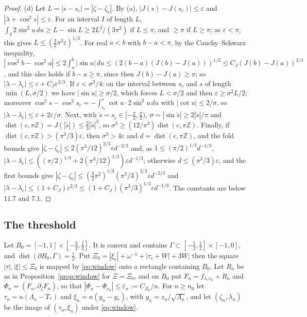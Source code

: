 \documentclass[11pt]{amsart}
\theoremstyle{definition}
\theoremstyle{remark}
\numberwithin{equation}{section}
\newcommand{\Z}{\mathbb{Z}}
\newcommand{\eps}{\varepsilon}
\DeclareMathOperator{\dist}{dist}
\begin{document}
\begin{proof}
(d) Let $L=|s-s_c|=|\zeta-\zeta_c|$. By (a), $|J(s)-J(s_c)|\le\eps$ and $|\lambda+\cos^2s|\le\eps$. For an interval
$I$ of length $L$, $\int_I2\sin^2u\,du\ge L-\sin L\ge2L^3/(3\pi^2)$ if $L\le\pi$, and $\ge\pi$ if $L\ge\pi$; as $\eps<\pi$,
this gives $L\le(\frac32\pi^2\eps)^{1/3}$. For real $a<b$ with $b-a<\pi$, by the Cauchy--Schwarz inequality,
$|\cos^2b-\cos^2a|\le2\int_a^b|\sin u|\,du\le(2(b-a)(J(b)-J(a)))^{1/2}\le C_J(J(b)-J(a))^{2/3}$, and this also holds
if $b-a\ge\pi$, since then $J(b)-J(a)\ge\pi$; so $|\lambda-\lambda_c|\le\eps+C_J\eps^{2/3}$. If $\eps<\sigma^3/4$: on
the interval between $s_c$ and $s$ of length $\min(L,\sigma/2)$ we have $|\sin u|\ge\sigma/2$, which forces
$L<\sigma/2$ and then $\eps\ge\sigma^2L/2$; moreover $\cos^2s-\cos^2s_c=-\int_{s_c}^s\cot u\cdot2\sin^2u\,du$ with
$|\cot u|\le2/\sigma$, so $|\lambda-\lambda_c|\le\eps+2\eps/\sigma$. Next, with $\tilde s=s_{\tilde c}\in[-\frac\pi2,\frac\pi2)$,
$\sigma=|\sin\tilde s|\ge2|\tilde s|/\pi$ and $\dist(c,\pi\Z)=J(|\tilde s|)\le\frac23|\tilde s|^3$, so
$\sigma^3\ge(12/\pi^3)\dist(c,\pi\Z)$. Finally, if $\dist(c,\pi\Z)>(\pi^3/3)\eps$, then $\sigma^3>4\eps$ and $d=\dist(c,\pi\Z)$,
and the fold bounds give $|\zeta-\zeta_c|\le2(\pi^3/12)^{2/3}\eps d^{-2/3}$ and, as $1\le(\pi/2)^{1/3}d^{-1/3}$,
$|\lambda-\lambda_c|\le((\pi/2)^{1/3}+2(\pi^3/12)^{1/3})\eps d^{-1/3}$; otherwise $d\le(\pi^3/3)\eps$, and the first
bounds give $|\zeta-\zeta_c|\le(\frac32\pi^2)^{1/3}(\pi^3/3)^{2/3}\eps d^{-2/3}$ and
$|\lambda-\lambda_c|\le(1+C_J)\eps^{2/3}\le(1+C_J)(\pi^3/3)^{1/3}\eps d^{-1/3}$. The constants are below $11.7$ and $7.1$.
\end{proof}

\subsection{The threshold}\label{sec:threshold}

Let $B_0=[-1,1]\times[-\frac32,\frac12]$. It is convex and contains $\Gamma\subset[-\frac12,\frac12]\times[-1,0]$, and
$\dist(\partial B_0,\Gamma)=\frac12$. Put $\Xi_0=|\xi_r|+\omega^{-1}+|\tau_c+W|+3W$; then the square $|\tau|,|\xi|\le \Xi_0$ is
mapped by \eqref{eq:window} onto a rectangle containing $B_0$. Let $R_n$ be as in Proposition~\ref{prop:window} for
$\Xi=\Xi_0$, and on $B_0$ put $F_n=f_{\lambda,c_n}+R_n$ and $\Phi_n=(F_n,\partial_\zeta F_n)$, so that
$|\Phi_n-\Phi_{c_n}|\le\bar\eps_n:=C_{\Xi_0}/n$. For $n\ge n_0$ let $\tau_n=n(\Lambda_n-T_*)$ and $\xi_n=n(y_n-y_*)$, with
$y_n=z_n/\sqrt{\Lambda_n}$, and let $(\zeta_n,\lambda_n)$ be the image of $(\tau_n,\xi_n)$ under \eqref{eq:window}.
\end{document}
